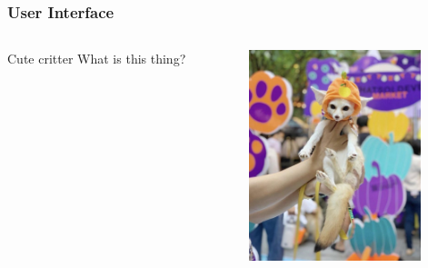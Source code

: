 \documentclass{beamer}
\begin{document}
\begin{frame}
    \frametitle{User Interface}

    \begin{columns}
        \begin{column}{0.48\textwidth}
            \begin{block}{Cute critter}
                What is this thing?
            \end{block}
        \end{column}
        \begin{column}{0.48\textwidth}
            \includegraphics[width=5cm]{what_is_this_thing}
        \end{column}
    \end{columns}

\end{frame}
\end{document}
